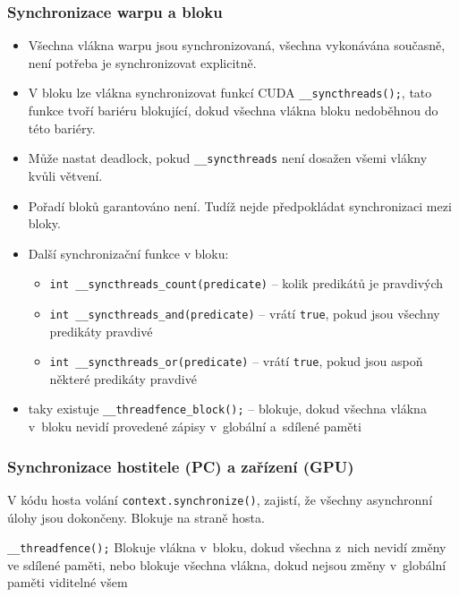 \subsubsection{Synchronizace warpu a bloku}
\begin{itemize}
    \item Všechna vlákna warpu jsou synchronizovaná, všechna vykonávána současně, není potřeba je synchronizovat explicitně.
    \item V bloku lze vlákna synchronizovat funkcí CUDA \texttt{\_\_syncthreads();}, tato funkce tvoří bariéru blokující, dokud všechna vlákna bloku nedoběhnou do této bariéry.
    \item Může nastat deadlock, pokud \texttt{\_\_syncthreads} není dosažen všemi vlákny kvůli větvení.
    \item Pořadí bloků garantováno není. Tudíž nejde předpokládat synchronizaci mezi bloky.
    \item Další synchronizační funkce v bloku:
    \begin{itemize}
        \item \texttt{int \_\_syncthreads\_count(predicate)} -- kolik predikátů je pravdivých
        \item \texttt{int \_\_syncthreads\_and(predicate)} -- vrátí \texttt{true}, pokud jsou všechny predikáty pravdivé
        \item \texttt{int \_\_syncthreads\_or(predicate)} -- vrátí \texttt{true}, pokud jsou aspoň některé predikáty pravdivé
    \end{itemize}
    \item taky existuje \texttt{\_\_threadfence\_block();} -- blokuje, dokud všechna vlákna v~bloku nevidí provedené zápisy v~globální a~sdílené paměti
\end{itemize}

\subsubsection{Synchronizace hostitele (PC) a zařízení (GPU)}
V kódu hosta volání \texttt{context.synchronize()}, zajistí, že všechny asynchronní úlohy jsou dokončeny. Blokuje na straně hosta.

\texttt{\_\_threadfence();} Blokuje vlákna v~bloku, dokud všechna z~nich nevidí změny ve sdílené paměti, nebo blokuje všechna vlákna, dokud nejsou změny v~globální paměti viditelné všem

